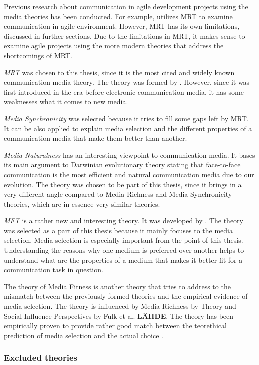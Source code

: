 \documentclass[english,12pt,a4paper,pdftex]{article}
\begin{document}
Previous research about communication in agile development projects using the media theories has been conducted. For example, \citet{korkala2006} utilizes \ac{MRT} to examine communication in agile environment. However, \ac{MRT} has its own limitations, discussed in further sections. Due to the limitations in \ac{MRT}, it makes sense to examine agile projects using the more modern theories that address the shortcomings of \ac{MRT}.

\emph{\ac{MRT}} was chosen to this thesis, since it is the most cited and widely known communication media theory. The theory was formed by \citet{daft1986}. However, since it was first introduced in the era before electronic communication media, it has some weaknesses what it comes to new media.

\emph{Media Synchronicity} was selected because it tries to fill some gaps left by \ac{MRT}. It can be also applied to explain media selection and the different properties of a communication media that make them better than another.

\emph{Media Naturalness} has an interesting viewpoint to communication media. It bases its main argument to Darwinian evolutionary theory stating that face-to-face communication is the most efficient and natural communication media due to our evolution. The theory was chosen to be part of this thesis, since it brings in a very different angle compared to Media Richness and Media Synchronicity theories, which are in essence very similar theories.

\emph{\Acl{MFT}} is a rather new and interesting theory. It was developed by \citet{higa2007}. The theory was selected as a part of this thesis because it mainly focuses to the media selection. Media selection is especially important from the point of this thesis. Understanding the reasons why one medium is preferred over another helps to understand what are the properties of a medium that makes it better fit for a communication task in question.

The theory of Media Fitness is another theory that tries to address to the mismatch between the previously formed theories and the empirical evidence of media selection. The theory is influenced by Media Richness by \citet{daft1986} Theory and Social Influence Perspectives by Fulk et al. \textbf{LÄHDE}. The theory has been empirically proven to provide rather good match between the teorethical prediction of media selection and the actual choice \citep{higa2007} \citep{gu2011}.

\subsubsection{Excluded theories}
\end{document}
